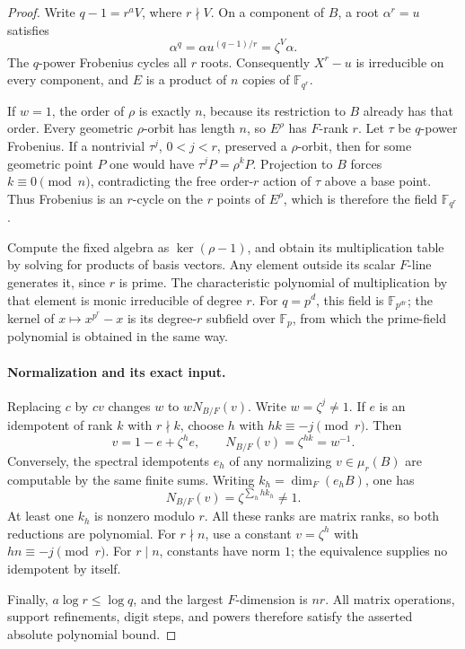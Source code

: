 \documentclass[11pt]{article}
\theoremstyle{definition}
\theoremstyle{remark}
\begin{document}
\begin{proof}
Write \(q-1=r^aV\), where \(r\nmid V\).
On a component of \(B\), a root \(\alpha^r=u\) satisfies
\[
                  \alpha^q=\alpha u^{(q-1)/r}
                          =\zeta^V\alpha.
\]
The \(q\)-power Frobenius cycles all \(r\) roots.
Consequently \(X^r-u\) is irreducible on every component, and
\(E\) is a product of \(n\) copies of \(\mathbb F_{q^r}\).

If \(w=1\), the order of \(\rho\) is exactly \(n\), because its
restriction to \(B\) already has that order.
Every geometric \(\rho\)-orbit has length \(n\), so \(E^\rho\)
has \(F\)-rank \(r\).
Let \(\tau\) be \(q\)-power Frobenius.
If a nontrivial \(\tau^j\), \(0<j<r\), preserved a
\(\rho\)-orbit, then for some geometric point \(P\) one would have
\(\tau^jP=\rho^kP\).
Projection to \(B\) forces \(k\equiv0\pmod n\), contradicting the
free order-\(r\) action of \(\tau\) above a base point.
Thus Frobenius is an \(r\)-cycle on the \(r\) points of \(E^\rho\),
which is therefore the field \(\mathbb F_{q^r}\).

Compute the fixed algebra as \(\ker(\rho-1)\), and obtain its
multiplication table by solving for products of basis vectors.
Any element outside its scalar \(F\)-line generates it, since \(r\)
is prime.  The characteristic polynomial of multiplication by that
element is monic irreducible of degree \(r\).
For \(q=p^d\), this field is \(\mathbb F_{p^{dr}}\);
the kernel of \(x\mapsto x^{p^r}-x\) is its degree-\(r\)
subfield over \(\mathbb F_p\), from which the prime-field polynomial
is obtained in the same way.

\paragraph{Normalization and its exact input.}
Replacing \(c\) by \(cv\) changes \(w\) to \(wN_{B/F}(v)\).
Write \(w=\zeta^j\ne1\).
If \(e\) is an idempotent of rank \(k\) with \(r\nmid k\),
choose \(h\) with \(hk\equiv-j\pmod r\).  Then
\[
                  v=1-e+\zeta^h e,\qquad
                  N_{B/F}(v)=\zeta^{hk}=w^{-1}.
\]
Conversely, the spectral idempotents \(e_h\) of any normalizing
\(v\in\mu_r(B)\) are computable by the same finite sums.
Writing \(k_h=\dim_F(e_hB)\), one has
\[
                         N_{B/F}(v)=\zeta^{\sum_h h k_h}\ne1.
\]
At least one \(k_h\) is nonzero modulo \(r\).
All these ranks are matrix ranks, so both reductions are polynomial.
For \(r\nmid n\), use a constant \(v=\zeta^h\) with
\(hn\equiv-j\pmod r\).  For \(r\mid n\), constants have norm \(1\);
the equivalence supplies no idempotent by itself.

Finally, \(a\log r\leq\log q\), and the largest \(F\)-dimension
is \(nr\).  All matrix operations, support refinements, digit steps,
and powers therefore satisfy the asserted absolute polynomial bound.
\end{proof}
\end{document}
